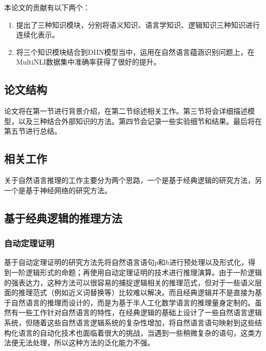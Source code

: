 \documentclass[UTF8,11pt,a4paper,nofonts]{ctexart}
\numberwithin{equation}{section}
\begin{document}
本论文的贡献有以下两个：

\begin{enumerate}
\item 提出了三种知识模块，分别将语义知识、语言学知识、逻辑知识三种知识进行连续化表示。
\item 将三个知识模块结合到DIIN模型当中，运用在自然语言蕴涵识别问题上，在MultiNLI数据集中准确率获得了很好的提升。
\end{enumerate}


\subsection{论文结构}

论文将在第一节进行背景介绍，在第二节综述相关工作。第三节将会详细描述模型，以及三种结合外部知识的方法。第四节会记录一些实验细节和结果。最后将在第五节进行总结。

\newpage
\begin{center}
\section{相关工作}
\end{center}
\par

关于自然语言推理的工作主要分为两个思路，一个是基于经典逻辑的研究方法，另一个是基于神经网络的研究方法。

\subsection{基于经典逻辑的推理方法}

\subsubsection{自动定理证明}

基于自动定理证明的研究方法\cite{Bos2005RecognisingTE, Abzianidze2017APL}先将自然语言语句$p$和$h$进行预处理以及形式化，得到一阶逻辑形式的命题；再使用自动定理证明\cite{Chang1973SymbolicLA}的技术进行推理演算。由于一阶逻辑的强表达力，这种方法可以很容易的捕捉逻辑相关的推理范式，但对于一些语义层面的推理范式（例如近义词替换等）比较难以解决。而且经典逻辑并不是直接为基于自然语言的推理而设计的，而是为基于半人工化数学语言的推理量身定制的。虽然有一些工作针对自然语言的特性，在经典逻辑的基础上设计了一些自然语言逻辑系统\cite{jushier2009}，但随着这些自然语言逻辑系统的复杂性增加，将自然语言语句映射到这些结构化语言的自动化技术也面临着很大的挑战，当遇到一些稍微复杂的语句，这类方法便无法处理，所以这种方法的泛化能力不强。
\end{document}
